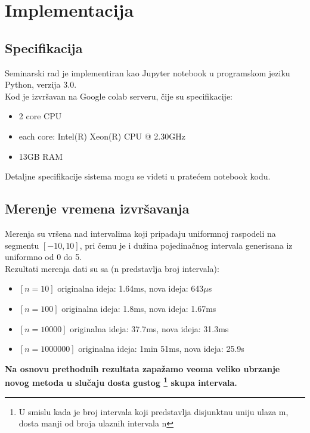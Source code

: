 \documentclass[a4paper]{article}
\begin{document}
\section{Implementacija}

\subsection{Specifikacija}

Seminarski rad je implementiran kao Jupyter notebook u programskom jeziku Python, verzija 3.0. \\
Kod je izvršavan na Google colab\cite{gcolab} serveru, čije su specifikacije:
\begin{itemize}
    \item 2 core CPU
    \item each core: Intel(R) Xeon(R) CPU @ 2.30GHz
    \item 13GB RAM
\end{itemize}

Detaljne specifikacije sistema mogu se videti u pratećem notebook kodu.

\subsection{Merenje vremena izvršavanja}

Merenja su vršena nad intervalima koji pripadaju uniformnoj raspodeli na segmentu $[-10, 10]$, pri čemu je i dužina pojedinačnog intervala generisana iz uniformno od 0 do 5. \\ 

Rezultati merenja dati su sa (n predstavlja broj intervala):
\begin{itemize}
    \item $[n = 10]$ originalna ideja: 1.64ms, nova ideja: 643$\mu$s
    \item $[n = 100]$ originalna ideja: 1.8ms, nova ideja: 1.67ms
    \item $[n = 10 000]$ originalna ideja: 37.7ms, nova ideja: 31.3ms
    \item $[n = 1 000 000]$ originalna ideja: 1min 51ms, nova ideja: 25.9s
\end{itemize}

\textbf{Na osnovu prethodnih rezultata zapažamo veoma veliko ubrzanje novog metoda u slučaju dosta gustog \footnote{U smislu kada je broj intervala koji predstavlja disjunktnu uniju ulaza m, dosta manji od broja ulaznih intervala n} skupa intervala.} \\
\end{document}
